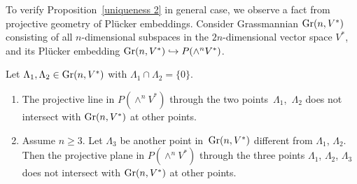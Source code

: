 To verify Proposition~\ref{uniqueness 2} in general case,
we observe a fact from projective geometry of Pl\"{u}cker embeddings.
Consider Grassmannian ${\rm Gr}(n, V^*)$ consisting of all
$n$-dimensional subspaces
in the $2n$-dimensional vector space $V^*$, and its
Pl\"{u}cker embedding ${\rm Gr}(n, V^*) \hookrightarrow P(\wedge^{n} V^*)$.

\begin{Lem}
\label{proj.geom}
Let $\Lambda_1, \Lambda_2 \in {\rm Gr}(n, V^*)$ with $\Lambda_1 \cap \Lambda_2 = \{ 0\}$.
\begin{enumerate}\itemsep=0pt
\item[$(1)$] The projective line in $P(\wedge^{n} V^*)$
through the two points~$\Lambda_1$,~$\Lambda_2$ does not intersect
with ${\rm Gr}(n, V^*)$ at other points.

\item[$(2)$] Assume $n \geq 3$. Let $\Lambda_3$ be another point in~${\rm Gr}(n, V^*)$
different from $\Lambda_1$, $\Lambda_2$. Then the projective plane
in $P(\wedge^{n} V^*)$ through the three points $\Lambda_1$, $\Lambda_2$,
$\Lambda_3$
does not intersect with ${\rm Gr}(n, V^*)$ at other points.
\end{enumerate}
\end{Lem}

